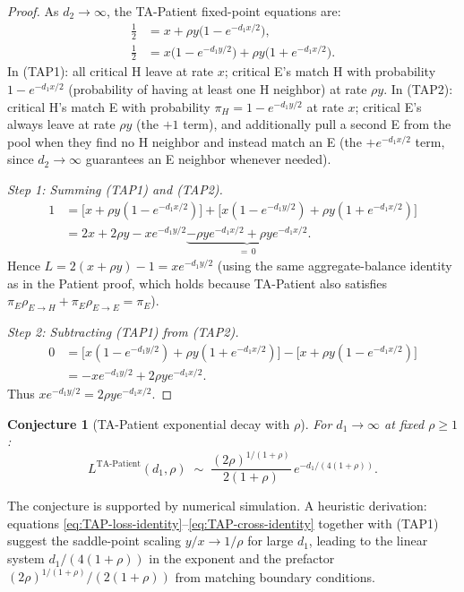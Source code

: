 \documentclass{article}
\theoremstyle{plain}
\newtheorem{conjecture}{Conjecture}
\theoremstyle{definition}
\begin{document}
\begin{proof}
As $d_2\to\infty$, the TA-Patient fixed-point equations are:
\begin{align}
  \tfrac{1}{2} &= x + \rho y\bigl(1-e^{-d_1 x/2}\bigr), \tag{TAP1}\\
  \tfrac{1}{2} &= x\bigl(1-e^{-d_1 y/2}\bigr)
                  +\rho y\bigl(1+e^{-d_1 x/2}\bigr). \tag{TAP2}
\end{align}
In (TAP1): all critical H leave at rate $x$; critical E's match H with
probability $1-e^{-d_1 x/2}$ (probability of having at least one H neighbor)
at rate $\rho y$.  In (TAP2): critical H's match E with probability
$\pi_H=1-e^{-d_1 y/2}$ at rate $x$; critical E's always leave at rate
$\rho y$ (the $+1$ term), and additionally pull a second E from the pool
when they find no H neighbor and instead match an E (the $+e^{-d_1 x/2}$
term, since $d_2\to\infty$ guarantees an E neighbor whenever needed).

\emph{Step 1: Summing (TAP1) and (TAP2).}
\begin{align*}
  1
    &= \bigl[x+\rho y(1-e^{-d_1 x/2})\bigr]
       +\bigl[x(1-e^{-d_1 y/2})+\rho y(1+e^{-d_1 x/2})\bigr]\\
    &= 2x+2\rho y - xe^{-d_1 y/2}
      \underbrace{-\rho ye^{-d_1 x/2}+\rho ye^{-d_1 x/2}}_{=\,0}.
\end{align*}
Hence $L=2(x+\rho y)-1=xe^{-d_1 y/2}$ (using the same aggregate-balance
identity as in the Patient proof, which holds because TA-Patient also
satisfies $\pi_E\rho_{E\to H}+\pi_E\rho_{E\to E}=\pi_E$).

\emph{Step 2: Subtracting (TAP1) from (TAP2).}
\begin{align*}
  0
    &= \bigl[x(1-e^{-d_1 y/2})+\rho y(1+e^{-d_1 x/2})\bigr]
       -\bigl[x+\rho y(1-e^{-d_1 x/2})\bigr]\\
    &= -xe^{-d_1 y/2}+2\rho ye^{-d_1 x/2}.
\end{align*}
Thus $xe^{-d_1 y/2}=2\rho ye^{-d_1 x/2}$.
\end{proof}

\begin{conjecture}[TA-Patient exponential decay with $\rho$]
\label{conj:TAP-rho}
For $d_1\to\infty$ at fixed $\rho\ge 1$:
\[
  \boxed{L^{\mathrm{TA\text{-}Patient}}(d_1,\rho)
    \;\sim\; \frac{(2\rho)^{1/(1+\rho)}}{2(1+\rho)}\,e^{-d_1/(4(1+\rho))}.}
\]
\end{conjecture}

The conjecture is supported by numerical simulation.  A heuristic derivation:
equations \eqref{eq:TAP-loss-identity}--\eqref{eq:TAP-cross-identity} together
with (TAP1) suggest the saddle-point scaling $y/x\to 1/\rho$ for large $d_1$,
leading to the linear system $d_1/(4(1+\rho))$ in the exponent and the
prefactor $(2\rho)^{1/(1+\rho)}/(2(1+\rho))$ from matching boundary
conditions.
\end{document}
